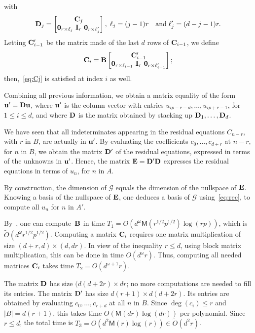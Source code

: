 \documentclass{sig-alternate}
\newcommand{\bigOsoft}{\tilde{O}}
\def\M{\ensuremath{\mathsf{M}}}
\def\mmu {\ensuremath{{\bf u}}}
\def\mB {\ensuremath{{\bf B}}}
\def\mI {\ensuremath{{\bf I}}}
\def\mZ {\ensuremath{{\bf 0}}}
\def\mC {\ensuremath{{\bf C}}}
\def\mD {\ensuremath{{\bf D}}}
\def\mE {\ensuremath{{\bf E}}}
\begin{document}
with
$$
\mD_j=\left [ \begin{matrix}   \mC_j   \\ \mZ_{r\times \ell_j}~\mI_r~\mZ_{r \times \ell'_j}
  \end{matrix} \right ], \;\ell_j = (j-1)r\quad\text{and}\; \ell'_j=(d-j-1)r.$$  
Letting $\mC'_{i-1}$ be the matrix made of the last $d$ rows of
$\mC_{i-1}$, we define
$$\mC_i = \mB \left [ \begin{matrix}   \mC_{i-1}'  \\ \mZ_{r\times \ell_{i-1}}~\mI_r~\mZ_{r \times \ell'_{i-1}} \end{matrix} \right ];$$ then,~\eqref{eq:Cj} is satisfied at index
$i$ as well. 

\smallskip{}
Combining all previous information, we obtain a matrix equality of the
form $\mmu' = \mD \mmu$, where $\mmu'$ is the column vector with entries
$u_{ip-r-d},\dots,u_{ip+r-1}$, for $1 \le i \le d$, and where $\mD$ is
the matrix obtained by stacking up $\mD_1,\dots,\mD_d$.

We have seen that all indeterminates appearing in the residual
equations $C_{n-r}$, with $r$ in $B$, are actually in $\mmu'$.  By
evaluating the coefficients $c_0,\dots,c_{d+r}$ at $n-r$, for $n$ in
$B$, we obtain the matrix $\mD'$ of the residual equations, expressed
in terms of the unknowns in $\mmu'$. Hence, the matrix $\mE=\mD'\mD$
expresses the residual equations in terms of $u_n$, for $n$ in $A$.

By construction, the dimension of $\mathcal{G}$ equals the dimension
of the nullspace of $\mE$. Knowing a basis of the nullspace of $\mE$,
one deduces a basis of $\mathcal{G}$ using~\eqref{eq:rec}, to compute
all $u_n$ for $n$ in $A'$.

\smallskip{} By~\cite[Lemma~7]{BoClSa05},
one can compute~$\mB$ in time $T_1 \!=\! O(d^\omega\M(r^{1/2}p^{1/2}) \log(rp))$,
which is $\bigOsoft(d^\omega r^{1/2} p^{1/2})$.
Computing a matrix $\mC_i$ requires one matrix multiplication of size
$(d+r,d) \times (d,dr)$. In view of the inequality $r \le d$,
using block matrix multiplication, this can be done in time
$O(d^\omega r)$. Thus, computing all needed matrices $\mC_i$ takes time
$T_2=O(d^{\omega+1} r)$.

The matrix $\mD$ has size $(d(d+2r) \times dr$; no more computations
are needed to fill its entries.
The matrix $\mD'$ has size $d(r+1) \times d(d+2r)$. Its entries are
obtained by evaluating $c_0,\dots,c_{r+d}$ at all $n$ in $B$. Since
$\deg(c_i)\le r$ and $|B|=d(r+1)$, this takes time $O(\M(dr)\log(dr))$
per polynomial. Since $r \le d$, the total time is
$T_3=O(d^2\M(r)\log(r)) \in \bigOsoft(d^2r)$.
\end{document}
